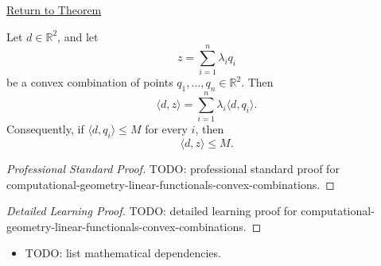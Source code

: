 \newpage
{}
\label{prf:computational-geometry-linear-functionals-convex-combinations}

\begin{remark*}[Return]
\hyperref[lem:computational-geometry-linear-functionals-convex-combinations]{Return to Theorem}
\end{remark*}

\begin{theorem*}
Let \(d\in\mathbb{R}^2\), and let
\[
  z=\sum_{i=1}^{n}\lambda_i q_i
\]
be a convex combination of points \(q_1,\dots,q_n\in\mathbb{R}^2\). Then
\[
  \langle d,z\rangle
  =
  \sum_{i=1}^{n}\lambda_i\langle d,q_i\rangle.
\]
Consequently, if \(\langle d,q_i\rangle\le M\) for every \(i\), then
\[
  \langle d,z\rangle\le M.
\]
\end{theorem*}

\begin{proof}[Professional Standard Proof]
\LRAProofBodyStart
TODO: professional standard proof for computational-geometry-linear-functionals-convex-combinations.
\end{proof}

\begin{proof}[Detailed Learning Proof]
\LRAProofBodyStart
TODO: detailed learning proof for computational-geometry-linear-functionals-convex-combinations.
\end{proof}

\begin{remark*}
\end{remark*}

\begin{dependencies}
\begin{itemize}
  \item TODO: list mathematical dependencies.
\end{itemize}
\end{dependencies}

\clearpage
